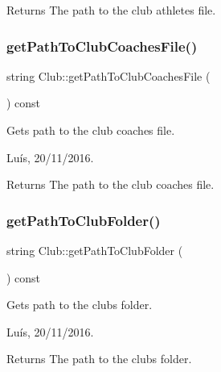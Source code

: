 \begin{DoxyReturn}{Returns}
The path to the club athletes file. 
\end{DoxyReturn}
\hypertarget{class_club_a9da4d254d3ae0844edfd140d8750bb33}{}\label{class_club_a9da4d254d3ae0844edfd140d8750bb33} 
\subsubsection{\texorpdfstring{get\+Path\+To\+Club\+Coaches\+File()}{getPathToClubCoachesFile()}}
{\footnotesize\ttfamily string Club\+::get\+Path\+To\+Club\+Coaches\+File (\begin{DoxyParamCaption}{ }\end{DoxyParamCaption}) const}



Gets path to the club coaches file. 

Luís, 20/11/2016. 

\begin{DoxyReturn}{Returns}
The path to the club coaches file. 
\end{DoxyReturn}
\hypertarget{class_club_ae3d6a0ff813da8740a801d3051105203}{}\label{class_club_ae3d6a0ff813da8740a801d3051105203} 
\subsubsection{\texorpdfstring{get\+Path\+To\+Club\+Folder()}{getPathToClubFolder()}}
{\footnotesize\ttfamily string Club\+::get\+Path\+To\+Club\+Folder (\begin{DoxyParamCaption}{ }\end{DoxyParamCaption}) const}



Gets path to the club\textquotesingle{}s folder. 

Luís, 20/11/2016. 

\begin{DoxyReturn}{Returns}
The path to the club\textquotesingle{}s folder. 
\end{DoxyReturn}
\hypertarget{class_club_abdac4c28ac139581c4745f08aff90c68}{}\label{class_club_abdac4c28ac139581c4745f08aff90c68} 
